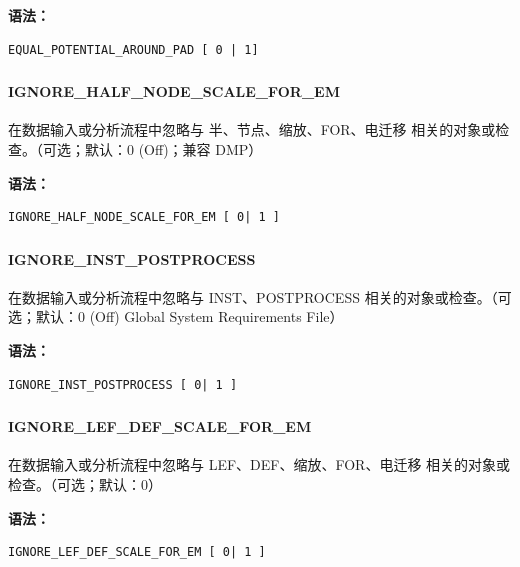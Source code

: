 \textbf{语法：}
\begin{lstlisting}
EQUAL_POTENTIAL_AROUND_PAD [ 0 | 1]
\end{lstlisting}

\subsubsection{}
\paragraph*{IGNORE_HALF_NODE_SCALE_FOR_EM}

在数据输入或分析流程中忽略与 半、节点、缩放、FOR、电迁移 相关的对象或检查。（可选；默认：0 (Off)；兼容 DMP）

\textbf{语法：}
\begin{lstlisting}
IGNORE_HALF_NODE_SCALE_FOR_EM [ 0| 1 ]
\end{lstlisting}

\subsubsection{}
\paragraph*{IGNORE_INST_POSTPROCESS}

在数据输入或分析流程中忽略与 INST、POSTPROCESS 相关的对象或检查。（可选；默认：0 (Off) Global System Requirements File）

\textbf{语法：}
\begin{lstlisting}
IGNORE_INST_POSTPROCESS [ 0| 1 ]
\end{lstlisting}

\subsubsection{}
\paragraph*{IGNORE_LEF_DEF_SCALE_FOR_EM}

在数据输入或分析流程中忽略与 LEF、DEF、缩放、FOR、电迁移 相关的对象或检查。（可选；默认：0）

\textbf{语法：}
\begin{lstlisting}
IGNORE_LEF_DEF_SCALE_FOR_EM [ 0| 1 ]
\end{lstlisting}

